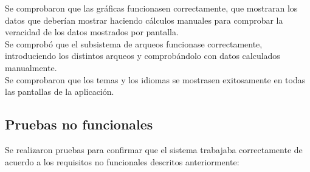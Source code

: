 Se comprobaron que las gráficas funcionasen correctamente, que mostraran los datos que deberían mostrar haciendo cálculos manuales para comprobar la veracidad de los datos mostrados por pantalla.\\

Se comprobó que el subsistema de arqueos funcionase correctamente, introduciendo los distintos arqueos y comprobándolo con datos calculados manualmente.\\

Se comprobaron que los temas y los idiomas se mostrasen exitosamente en todas las pantallas de la aplicación.

\subsection{Pruebas no funcionales}

Se realizaron pruebas para confirmar que el sistema trabajaba correctamente de acuerdo a los requisitos no funcionales descritos anteriormente:

